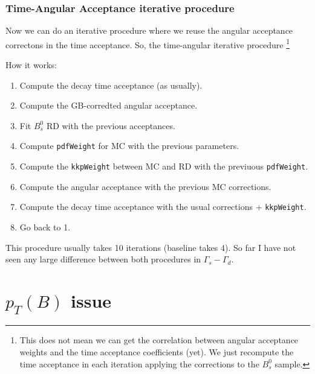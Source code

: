 \documentclass[9pt,aspectratio=43]{beamer}
\begin{document}
%
\begin{frame}[default]
\frametitle{Time-Angular Acceptance iterative procedure}

Now we can do an iterative procedure where we reuse the angular acceptance
correctons in the time acceptance. So, the time-angular iterative procedure
\footnote{This does not mean we can get the correlation between angular acceptance
weights and the time acceptance coefficients (yet). We just recompute the time
acceptance in each iteration applying the corrections to the $B_s^0$
sample.}

How it works:
\begin{enumerate}
  \addtocounter{enumi}{-2}
  \item Compute the decay time acceptance (as usually).
  \item Compute the GB-corredted angular acceptance.
  \item Fit $B_s^0$ RD with the previous acceptances.
  \item Compute \texttt{pdfWeight} for MC with the previous parameters.
  \item Compute the \texttt{kkpWeight} between MC and RD with the previuous \texttt{pdfWeight}.
  \item Compute the angular acceptance with the previous MC corrections.
  \item Compute the decay time acceptance with the usual corrections + \texttt{kkpWeight}.
  \item Go back to 1.
\end{enumerate}

This procedure usually takes 10 iterations (baseline takes 4).
So far I have not seen any large difference between both procedures
in $\Gamma_s - \Gamma_d$.

\end{frame}
%


\section{$p_T(B)$ issue}
\end{document}
